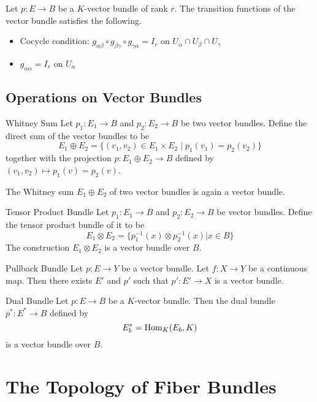 \documentclass[a4paper]{article}
\begin{document}
\begin{prp}{}{} Let $p:E\to B$ be a $K$-vector bundle of rank $r$. The transition functions of the vector bundle satisfies the following. 
\begin{itemize}
\item Cocycle condition: $g_{\alpha\beta}\circ g_{\beta\gamma}\circ g_{\gamma\alpha}=I_r$ on $U_\alpha\cap U_\beta\cap U_\gamma$
\item $g_{\alpha\alpha}=I_r$ on $U_\alpha$
\end{itemize}
\end{prp}

\subsection{Operations on Vector Bundles}
\begin{defn}{Whitney Sum}{} Let $p_1:E_1\to B$ and $p_2:E_2\to B$ be two vector bundles. Define the direct sum of the vector bundles to be $$E_1\oplus E_2=\{(v_1,v_2)\in E_1\times E_2\;|\;p_1(v_1)=p_2(v_2)\}$$ together with the projection $p:E_1\oplus E_2\to B$ defined by $(v_1,v_2)\mapsto p_1(v)=p_2(v)$. 
\end{defn}

\begin{lmm}{}{} The Whitney sum $E_1\oplus E_2$ of two vector bundles is again a vector bundle. 
\end{lmm}

\begin{prp}{Tensor Product Bundle}{} Let $p_1:E_1\to B$ and $p_2:E_2\to B$ be vector bundles. Define the tensor product bundle of it to be $$E_1\otimes E_2=\{p_1^{-1}(x)\otimes p_2^{-1}(x)|x\in B\}$$ The construction $E_1\otimes E_2$ is a vector bundle over $B$. 
\end{prp}

\begin{thm}{Pullback Bundle}{} Let $p:E\to Y$ be a vector bundle. Let $f:X\to Y$ be a continuous map. Then there exists $E'$ and $p'$ such that $p':E'\to X$ is a vector bundle. 
\end{thm}

\begin{thm}{Dual Bundle}{} Let $p:E\to B$ be a $K$-vector bundle. Then the dual bundle $p^\ast:E^\ast\to B$ defined by $$E_b^\ast=\operatorname{Hom}_K(E_b,K)$$ is a vector bundle over $B$. 
\end{thm}

\pagebreak
\section{The Topology of Fiber Bundles}
\end{document}
